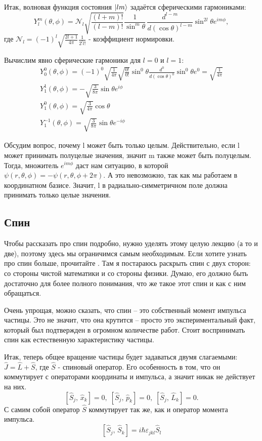 Итак, волновая функция состояния $\ket{lm}$ задаётся сферическими гармониками:
\[
Y^m_l(\theta, \phi) = \mathcal{N}_l\sqrt{\frac{(l+m)!}{(l-m)!}} \frac{1}{\sin^{m}\theta}\,\frac{d^{l-m}}{d(\cos\theta)^{l-m}}\sin^{2l}\theta e^{im\phi},
\]
где $\mathcal{N}_l = (-1)^l \sqrt{\frac{2l+1}{4\pi}}\frac{1}{2^l l!}$ - коэффициент нормировки.

Вычислим явно сферические гармоники для $l=0$ и $l=1$:
\begin{gather*}
Y^0_0(\theta,\phi) = (-1)^0\sqrt{\frac{1}{4\pi}}\sqrt{\frac{0!}{0!}}\sin^0\theta \frac{d^0}{d(\cos\theta)^0} \sin^0 \theta e^{0} = \sqrt{\frac{1}{4\pi}}\\
Y^1_1(\theta,\phi) = -\sqrt{\frac{3}{8\pi}}\sin\theta e^{i\phi}\\
Y^0_1(\theta,\phi) = \sqrt{\frac{3}{4\pi}}\cos\theta\\
Y^{-1}_1(\theta,\phi) = \sqrt{\frac{3}{8\pi}}\sin\theta e^{-i\phi}
\end{gather*}

Обсудим вопрос, почему l может быть только целым. Действительно, если l может принимать полуцелые значения, значит m также может быть полуцелым. Тогда, множитель $e^{im\phi}$ даст нам ситуацию, в которой $\psi(r, \theta, \phi) = -\psi(r, \theta, \phi + 2\pi)$. А это невозможно, так как мы работаем в координатном базисе. Значит, l в радиально-симметричном поле должна принимать только целые значения.

\subsection{Спин}
\hspace{1em} Чтобы рассказать про спин подробно, нужно уделять этому целую лекцию (а то и две), поэтому здесь мы ограничимся самым необходимым. Если хотите узнать про спин больше, прочитайте . Там я постараюсь раскрыть спин с двух сторон: со стороны чистой математики и со стороны физики. Думаю, его должно быть достаточно для более полного понимания, что же такое этот спин и как с ним обращаться.

Очень упрощая, можно сказать, что спин -- это собственный момент импульса частицы. Это не значит, что она крутится -- просто это экспериментальный факт, который был подтвержден в огромном количестве работ. Стоит воспринимать спин как естественную характеристику частицы.

Итак, теперь общее вращение частицы будет задаваться двумя слагаемыми: $\hat{J} = \hat{L} + \hat{S}$, где $\hat{S}$ - спиновый оператор. Его особенность в том, что он коммутирует с операторами координаты и импульса, а значит никак не действует на них.
\[
\left[\hat{S}_j, \, \hat{x}_k\right] = 0,\; \left[\hat{S}_j, \, \hat{p}_k\right] = 0,\; \left[\hat{S}_j, \, \hat{L}_k\right] = 0.
\]
С самим собой оператор $\hat{S}$ коммутирует так же, как и оператор момента импульса.
\[
\left[\hat{S}_j, \, \hat{S}_k\right] = i\hbar\varepsilon_{jkl}\hat{S}_l
\]

